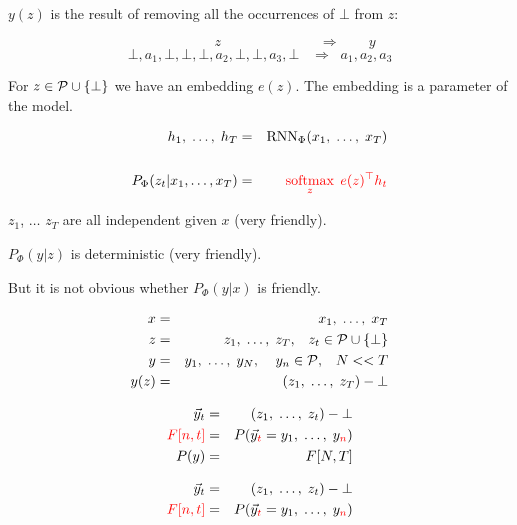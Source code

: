 {\vfill
$y(z)$ is the result of removing all the occurrences of $\bot$ from $z$:

{\color{red} $$\hspace{5em} z \hspace{7em} \Rightarrow \hspace{2em} y$$}
{\color{red} $$\bot,a_1,\bot,\bot,\bot,a_2,\bot,\bot,a_3,\bot \;\;\;\Rightarrow\;\; a_1,a_2,a_3$$}



For $z \in {\cal P} \cup \{\bot\}$ we have an embedding $e(z)$.  The embedding is a parameter of the model.

\begin{eqnarray*}
  h_1,\;\ldots,\;h_T & = & \mathrm{RNN}_\Phi(x_1,\;\ldots,\;x_T) \\
  \\
  P_\Phi(z_t|x_1,\ldots,x_T) & = & {\color{red} \operatorname*{softmax}_{z} \;e(z)^\top h_t}
\end{eqnarray*}

\vfill
$z_1$, $\ldots$ $z_T$ are {\color{red}  all independent} given $x$ (very friendly).

\vfill
$P_\Phi(y|z)$ is {\color{red} deterministic} (very friendly).

\vfill
{\color{red} But it is not obvious whether $P_\Phi(y|x)$ is friendly.}


\begin{eqnarray*}
  x & = & x_1,\;\ldots,\; x_T \\
  z & = & z_1, \;\ldots,\;z_T,\;\;\;z_t \in {\cal P}\cup \{\bot\} \\
  y & = & y_1,\;\ldots,\;y_N,\;\;\;\;y_n \in {\cal P},\;\;\;N << T \\
  y(z) & = & (z_1,\;\ldots,\;z_T) - \bot
\end{eqnarray*}

\vfill

\begin{eqnarray*}
  \vec{y}_t & = & (z_1,\;\ldots,\;z_t)-\bot \\
  {\color{red} F[n,t]} & = & P(\vec{y}_{\color{red} t} = y_1,\;\ldots,\;y_{\color{red} n}) \\
  P(y) & = & F[N,T]
\end{eqnarray*}


\begin{eqnarray*}
  \vec{y}_t & = & (z_1,\;\ldots,\;z_t)-\bot \\
  {\color{red} F[n,t]} & = & P(\vec{y}_{\color{red} t} = y_1,\;\ldots,\;y_{\color{red} n}) \\
\end{eqnarray*}

}
